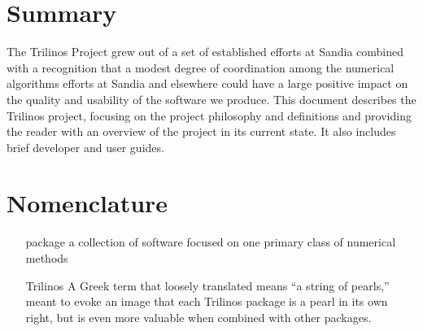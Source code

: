 \documentclass[12pt,strict]{SANDreport}
\begin{document}


    \clearpage
    \section{Summary}
The Trilinos Project grew out of a set of established efforts at Sandia combined with
a recognition that a modest degree of coordination among the numerical algorithms
efforts at Sandia and elsewhere could have a large positive impact on the quality and
usability of the software we produce.  This document describes the Trilinos project,
focusing on the project philosophy and definitions and
providing the reader with an overview of the project in its current state.  It also
includes brief developer and user guides.


    \clearpage
    \section*{Nomenclature}
    \begin{itemize}
	\item[package]
	    a collection of software focused on one primary class of numerical methods
	\item[Trilinos]
	    A Greek term that loosely translated means ``a string of pearls,'' meant
         to evoke an image that each Trilinos package is a pearl in its own right,
         but is even more valuable when combined with other packages.
    \end{itemize}


    \SANDmain		%
\end{document}
